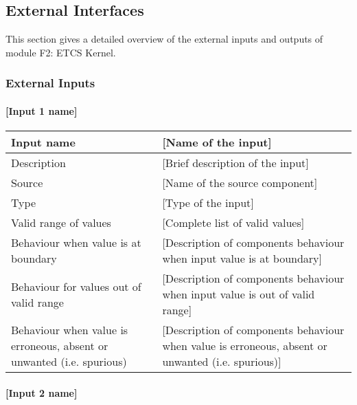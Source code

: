 \subsection{External Interfaces}
This section gives a detailed overview of the external inputs and outputs of module F2: ETCS Kernel.

\subsubsection{External Inputs}

\paragraph{[Input 1 name]}

\begin{longtable}{p{}p{}}
\toprule
Input name				& [Name of the input] \\
\midrule
Description				& [Brief description of the input] \\
\midrule
Source					& [Name of the source component] \\ 
\midrule
Type					& [Type of the input] \\
\midrule
Valid range of values	& [Complete list of valid values] \\
\midrule
Behaviour when value is at boundary	& [Description of components behaviour when input value is at boundary] \\
\midrule
Behaviour for values out of valid range	& [Description of components behaviour when input value is out of valid range] \\
\midrule
Behaviour when value is erroneous, absent or unwanted (i.e. spurious) & [Description of components behaviour when value is erroneous, absent or unwanted (i.e. spurious)] \\
\bottomrule
\end{longtable}

\paragraph{[Input 2 name]}

